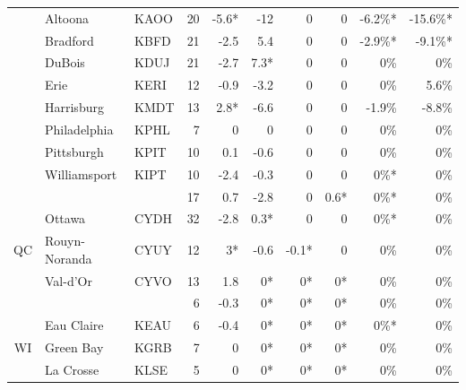 \documentclass[twocol]{ametsoc}
\begin{document}
\begin{landscape}
\begin{table}[]
\begin{tabular}{@{}cllrrrrrrr@{}}
                     & Altoona                    & KAOO & 20   & -5.6* & -12   & 0     & 0    & -6.2\%* & -15.6\%* \\
                     & Bradford                   & KBFD & 21   & -2.5  & 5.4   & 0     & 0    & -2.9\%* & -9.1\%*  \\
                     & DuBois                     & KDUJ & 21   & -2.7  & 7.3*  & 0     & 0    & 0\%     & 0\%      \\
                     & Erie                       & KERI & 12   & -0.9  & -3.2  & 0     & 0    & 0\%     & 5.6\%    \\
                     & Harrisburg                 & KMDT & 13   & 2.8*  & -6.6  & 0     & 0    & -1.9\%  & -8.8\%   \\
                     & Philadelphia               & KPHL & 7    & 0     & 0     & 0     & 0    & 0\%     & 0\%      \\
                     & Pittsburgh                 & KPIT & 10   & 0.1   & -0.6  & 0     & 0    & 0\%     & 0\%      \\
                     & Williamsport               & KIPT & 10   & -2.4  & -0.3  & 0     & 0    & 0\%*    & 0\%      \\ \cmidrule(l){2-10} 
                     &                            &      & 17   & 0.7   & -2.8  & 0     & 0.6* & 0\%*    & 0\%      \\ \midrule
\multirow{3}{*}{QC}  & Ottawa                     & CYDH & 32   & -2.8  & 0.3*  & 0     & 0    & 0\%*    & 0\%      \\
                     & Rouyn-Noranda              & CYUY & 12   & 3*    & -0.6  & -0.1* & 0    & 0\%     & 0\%      \\
                     & Val-d'Or                   & CYVO & 13   & 1.8   & 0*    & 0*    & 0*   & 0\%     & 0\%      \\ \cmidrule(l){2-10} 
                     &                            &      & 6    & -0.3  & 0*    & 0*    & 0*   & 0\%     & 0\%      \\ \midrule
\multirow{6}{*}{WI}  & Eau Claire                 & KEAU & 6    & -0.4  & 0*    & 0*    & 0*   & 0\%*    & 0\%      \\
                     & Green Bay                  & KGRB & 7    & 0     & 0*    & 0*    & 0*   & 0\%     & 0\%      \\
                     & La Crosse                  & KLSE & 5    & 0     & 0*    & 0*    & 0*   & 0\%     & 0\%      \\

\end{tabular}
\end{table}
\end{landscape}
\end{document}
